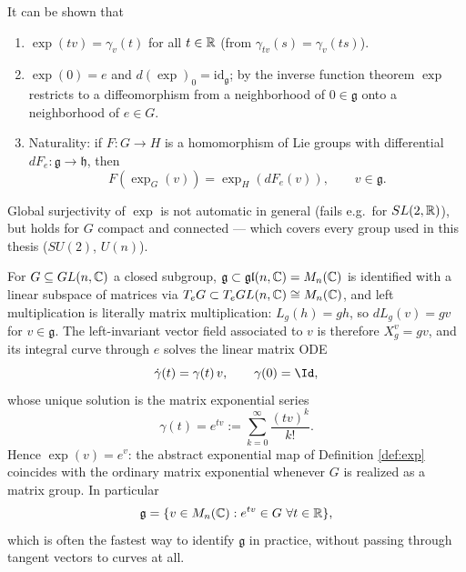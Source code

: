 \begin{proposition}\label{prop:exp-props}
	It can be shown that
	\begin{enumerate}
		\item $\exp(tv) = \gamma_v(t)$ for all $t\in\mathbb{R}$ (from $\gamma_{tv}(s)=\gamma_v(ts)$).
		\item $\exp(0)=e$ and $d(\exp)_0 = \mathrm{id}_{\mathfrak g}$; by the inverse function theorem $\exp$ restricts to a diffeomorphism from a neighborhood of $0\in\mathfrak g$ onto a neighborhood of $e\in G$.
		\item Naturality: if $F:G\to H$ is a homomorphism of Lie groups with differential $dF_e:\mathfrak g\to\mathfrak h$, then
		\[
		F(\exp_G(v)) = \exp_H(dF_e(v)), \qquad v\in\mathfrak g.
		\]
	\end{enumerate}
\end{proposition}

\begin{remark}
	Global surjectivity of $\exp$ is not automatic in general (fails e.g.\ for $SL(2,\mathbb{R})$), but holds for $G$ compact and connected — which covers every group used in this thesis ($SU(2)$, $U(n)$).
\end{remark}

\begin{remark}
	For $G \subseteq GL(n,\mathbb{C})$ a closed subgroup, $\mathfrak g \subset \mathfrak{gl}(n,\mathbb{C}) = M_n(\mathbb{C})$ is identified with a linear subspace of matrices via $T_eG \subset T_eGL(n,\mathbb{C}) \cong M_n(\mathbb{C})$, and left multiplication is literally matrix multiplication: $L_g(h) = gh$, so $dL_g(v) = gv$ for $v \in \mathfrak g$. The left-invariant vector field associated to $v$ is therefore $X^v_g = gv$, and its integral curve through $e$ solves the linear matrix ODE
	\[
	\dot\gamma(t) = \gamma(t)\, v, \qquad \gamma(0) = \Id,
	\]
	whose unique solution is the matrix exponential series
	\[
	\gamma(t) = e^{tv} := \sum_{k=0}^\infty \frac{(tv)^k}{k!}.
	\]
	Hence $\exp(v) = e^{v}$: the abstract exponential map of Definition \ref{def:exp} coincides with the ordinary matrix exponential whenever $G$ is realized as a matrix group. In particular
	\[
	\mathfrak g = \{v \in M_n(\C) : e^{tv} \in G \ \forall t \in \R\},
	\]
	which is often the fastest way to identify $\mathfrak g$ in practice, without passing through tangent vectors to curves at all.
\end{remark}

